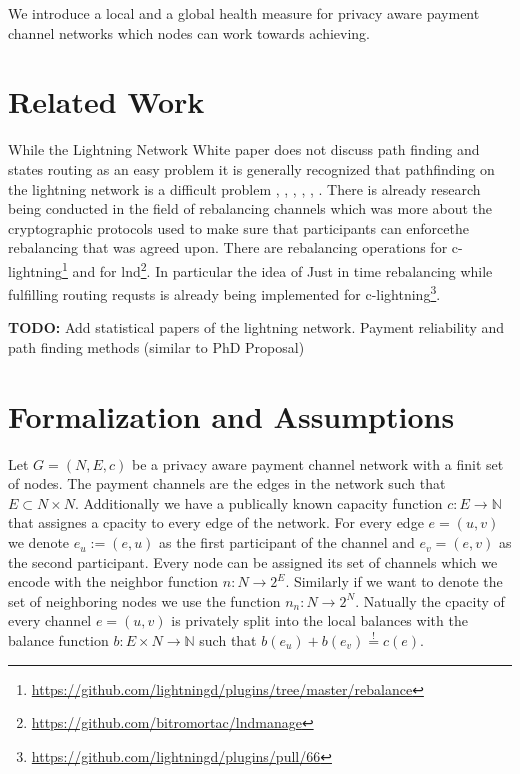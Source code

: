 \documentclass[a4paper]{paper}
\begin{document}
We introduce a local and a global health measure for privacy aware payment channel networks which nodes can work towards achieving.
\section{Related Work}
While the Lightning Network White paper \cite{poon2016bitcoin} does not discuss path finding and states routing as an easy problem it is generally recognized that pathfinding on the lightning network is a difficult problem \cite{piatkivskyi2018split}, \cite{prihodko2016flare}, \cite{bagaria2019boomerang}, \cite{pickhardt2019pathfinding}, \cite{grunspan2018ant}, \cite{sivaraman2018routing}.
There is already research being conducted in the field of rebalancing channels \cite{khalil2017revive} which was more about the cryptographic protocols used to make sure that participants can enforcethe rebalancing that was agreed upon.
There are rebalancing operations for c-lightning\footnote{\url{https://github.com/lightningd/plugins/tree/master/rebalance}} and for lnd\footnote{\url{https://github.com/bitromortac/lndmanage}}.
In particular the idea of Just in time rebalancing while fulfilling routing requsts \cite{pickhardt2019jit} is already being implemented for c-lightning\footnote{\url{https://github.com/lightningd/plugins/pull/66}}. 

\textbf{TODO:} Add statistical papers of the lightning network. Payment reliability and path finding methods (similar to PhD Proposal)


\section{Formalization and Assumptions}
Let $G=(N,E,c)$ be a privacy aware payment channel network with a finit set of nodes.
The payment channels are the edges in the network such that $E\subset N\times N$.
Additionally we have a publically known capacity function $c: E\longrightarrow \mathbb{N}$ that assignes a cpacity to every edge of the network.
For every edge $e=(u,v)$ we denote $e_u:=(e,u)$ as the first participant of the channel and $e_v=(e,v)$ as the second participant.
Every node can be assigned its set of channels which we encode with the neighbor function $n : N \longrightarrow 2^{E}$.
Similarly if we want to denote the set of neighboring nodes we use the function $n_n : N \longrightarrow 2^{N}$.
Natually the cpacity of every channel $e=(u,v)$ is privately split into the local balances with the balance function $b: E\times N\longrightarrow\mathbb{N}$ such that $b(e_u)+b(e_v)\stackrel{!}{=}c(e)$.
\end{document}
